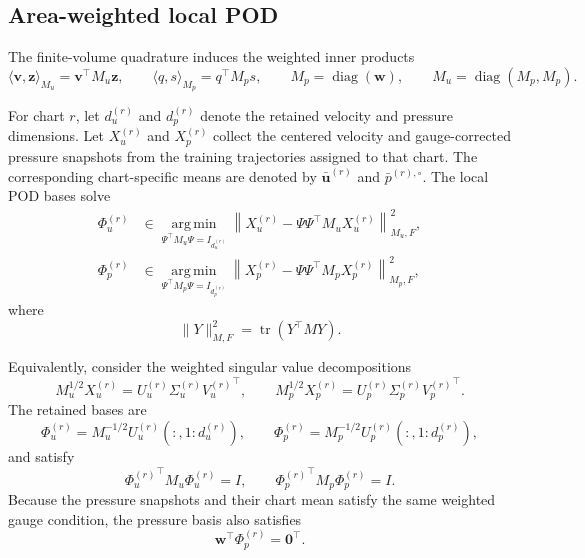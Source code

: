 \subsection{Area-weighted local POD}

The finite-volume quadrature induces the weighted inner products
\begin{equation}
    \langle\bm v,\bm z\rangle_{M_u}
    =
    \bm v^\top M_u\bm z,
    \qquad
    \langle q,s\rangle_{M_p}
    =
    q^\top M_p s,
    \qquad
    M_p=\operatorname{diag}(\bm w),
    \qquad
    M_u=\operatorname{diag}(M_p,M_p).
    \label{eq:app_weighted_inner_products}
\end{equation}

For chart $r$, let $d_u^{(r)}$ and $d_p^{(r)}$ denote the retained velocity and pressure dimensions. Let $X_u^{(r)}$ and $X_p^{(r)}$ collect the centered velocity and gauge-corrected pressure snapshots from the training trajectories assigned to that chart. The corresponding chart-specific means are denoted by
$\bar{\bm u}^{(r)}$ and $\bar p^{(r),\circ}$.
The local POD bases solve
\begin{align}
    \Phi_u^{(r)}
    &\in
    \underset{\Psi^\top M_u\Psi=I_{d_u^{(r)}}}
    {\operatorname{arg\,min}}
    \left\|
        X_u^{(r)}
        -\Psi\Psi^\top M_uX_u^{(r)}
    \right\|_{M_u,F}^2,
    \\
    \Phi_p^{(r)}
    &\in
    \underset{\Psi^\top M_p\Psi=I_{d_p^{(r)}}}
    {\operatorname{arg\,min}}
    \left\|
        X_p^{(r)}
        -\Psi\Psi^\top M_pX_p^{(r)}
    \right\|_{M_p,F}^2,
    \label{eq:app_pod_optimization}
\end{align}
where
\begin{equation}
    \|Y\|_{M,F}^2=\operatorname{tr}(Y^\top MY).
\end{equation}

Equivalently, consider the weighted singular value decompositions
\begin{equation}
    M_u^{1/2}X_u^{(r)}
    =
    U_u^{(r)}\Sigma_u^{(r)}{V_u^{(r)}}^\top,
    \qquad
    M_p^{1/2}X_p^{(r)}
    =
    U_p^{(r)}\Sigma_p^{(r)}{V_p^{(r)}}^\top.
\end{equation}
The retained bases are
\begin{equation}
    \Phi_u^{(r)}
    =
    M_u^{-1/2}
    U_u^{(r)}(:,1{:}d_u^{(r)}),
    \qquad
    \Phi_p^{(r)}
    =
    M_p^{-1/2}
    U_p^{(r)}(:,1{:}d_p^{(r)}),
    \label{eq:app_weighted_svd_bases}
\end{equation}
and satisfy
\begin{equation}
    {\Phi_u^{(r)}}^\top M_u\Phi_u^{(r)}=I,
    \qquad
    {\Phi_p^{(r)}}^\top M_p\Phi_p^{(r)}=I.
\end{equation}
Because the pressure snapshots and their chart mean satisfy the same weighted gauge condition, the pressure basis also satisfies
\begin{equation}
    \bm w^\top\Phi_p^{(r)}=\bm 0^\top .
\end{equation}

